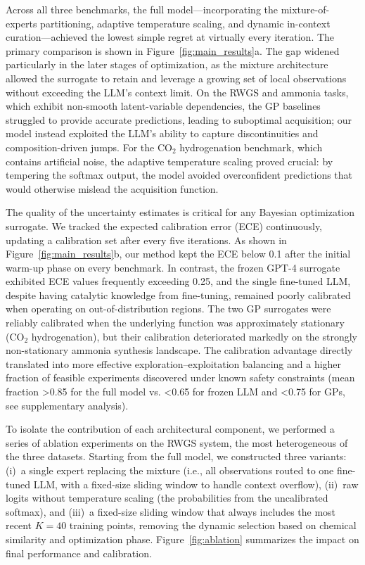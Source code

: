 \documentclass{article}
\begin{document}
Across all three benchmarks, the full model—incorporating the mixture-of-experts partitioning, adaptive temperature scaling, and dynamic in-context curation—achieved the lowest simple regret at virtually every iteration. The primary comparison is shown in Figure~\ref{fig:main_results}a. The gap widened particularly in the later stages of optimization, as the mixture architecture allowed the surrogate to retain and leverage a growing set of local observations without exceeding the LLM’s context limit. On the RWGS and ammonia tasks, which exhibit non-smooth latent-variable dependencies, the GP baselines struggled to provide accurate predictions, leading to suboptimal acquisition; our model instead exploited the LLM’s ability to capture discontinuities and composition-driven jumps. For the CO\(_2\) hydrogenation benchmark, which contains artificial noise, the adaptive temperature scaling proved crucial: by tempering the softmax output, the model avoided overconfident predictions that would otherwise mislead the acquisition function.

The quality of the uncertainty estimates is critical for any Bayesian optimization surrogate. We tracked the expected calibration error (ECE) continuously, updating a calibration set after every five iterations. As shown in Figure~\ref{fig:main_results}b, our method kept the ECE below \num{0.1} after the initial warm-up phase on every benchmark. In contrast, the frozen GPT-4 surrogate exhibited ECE values frequently exceeding \num{0.25}, and the single fine-tuned LLM, despite having catalytic knowledge from fine-tuning, remained poorly calibrated when operating on out-of-distribution regions. The two GP surrogates were reliably calibrated when the underlying function was approximately stationary (CO\(_2\) hydrogenation), but their calibration deteriorated markedly on the strongly non-stationary ammonia synthesis landscape. The calibration advantage directly translated into more effective exploration–exploitation balancing and a higher fraction of feasible experiments discovered under known safety constraints (mean fraction >0.85 for the full model vs. <0.65 for frozen LLM and <0.75 for GPs, see supplementary analysis).

To isolate the contribution of each architectural component, we performed a series of ablation experiments on the RWGS system, the most heterogeneous of the three datasets. Starting from the full model, we constructed three variants: (i)~a single expert replacing the mixture (i.e., all observations routed to one fine-tuned LLM, with a fixed-size sliding window to handle context overflow), (ii)~raw logits without temperature scaling (the probabilities from the uncalibrated softmax), and (iii)~a fixed-size sliding window that always includes the most recent \(K=40\) training points, removing the dynamic selection based on chemical similarity and optimization phase. Figure~\ref{fig:ablation} summarizes the impact on final performance and calibration.
\end{document}
